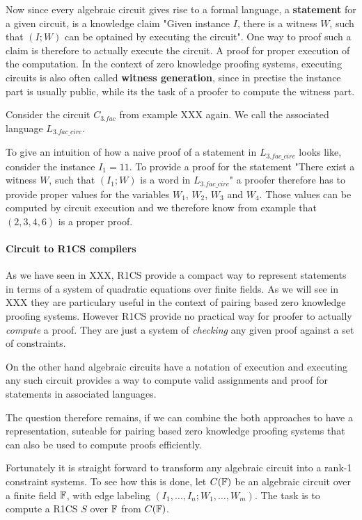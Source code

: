 Now since every algebraic circuit gives rise to a formal language, a \textbf{statement} for a given circuit, is a knowledge claim "Given instance $I$, there is a witness $W$, such that $(I;W)$ can be optained by executing the circuit". One way to proof such a claim is therefore to actually execute the circuit. A proof for proper execution of the computation. In the context of zero knowledge proofing systems, executing circuits is also often called \textbf{witness generation}, since in prectise the instance part is usually public, while its the task of a proofer to compute the witness part.
\begin{example}[3-Factorization]Consider the circuit $C_{3.fac}$ from example XXX again. We call the associated language $L_{3.fac\_circ}$.

To give an intuition of how a naive proof of a statement in $L_{3.fac\_circ}$ looks like, consider the instance $I_1= 11$. To provide a proof for the statement "There exist a witness $W$, such that $(I_1;W)$ is a word in $L_{3.fac\_circ}$" a proofer therefore has to provide proper values for the variables $W_1$, $W_2$, $W_3$ and $W_4$. Those values can be computed by circuit execution and we therefore know from example that $(2,3,4,6)$ is a proper proof.
\end{example}
\paragraph{Circuit to R1CS compilers} As we have seen in XXX, R1CS provide a compact way to represent statements in terms of a system of quadratic equations over finite fields. As we will see in XXX they are particulary useful in the context of pairing based zero knowledge proofing systems. However R1CS provide no practical way for proofer to actually \textit{compute} a proof. They are just a system of \textit{checking} any given proof against a set of constraints.

On the other hand algebraic circuits have a notation of execution and executing any such circuit provides a way to compute valid assignments and proof for statements in associated languages. 

The question therefore remains, if we can combine the both approaches to have a representation, suteable for pairing based zero knowledge proofing systems that can also be used to compute proofs efficiently.

Fortunately it is straight forward to transform any algebraic circuit into a rank-1 constraint systems. To see how this is done, let $C(\mathbb{F})$ be an algebraic circuit over a finite field $\mathbb{F}$, with edge labeling $(I_1,\ldots,I_n;W_1,\ldots,W_m)$. The task is to compute a R1CS $S$ over $\mathbb{F}$ from $C(\mathbb{F})$.  


